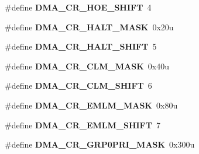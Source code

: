 \begin{DoxyCompactItemize}
\item 
\hypertarget{group___d_m_a___register___masks_gaddcd684abfce8db15928255dc243dbcb}{}\#define {\bfseries D\+M\+A\+\_\+\+C\+R\+\_\+\+H\+O\+E\+\_\+\+S\+H\+I\+F\+T}~4\label{group___d_m_a___register___masks_gaddcd684abfce8db15928255dc243dbcb}

\item 
\hypertarget{group___d_m_a___register___masks_ga03242701b29af462fbfd276ea315dd54}{}\#define {\bfseries D\+M\+A\+\_\+\+C\+R\+\_\+\+H\+A\+L\+T\+\_\+\+M\+A\+S\+K}~0x20u\label{group___d_m_a___register___masks_ga03242701b29af462fbfd276ea315dd54}

\item 
\hypertarget{group___d_m_a___register___masks_ga268b8561e52e0582a789cd08fc36f7aa}{}\#define {\bfseries D\+M\+A\+\_\+\+C\+R\+\_\+\+H\+A\+L\+T\+\_\+\+S\+H\+I\+F\+T}~5\label{group___d_m_a___register___masks_ga268b8561e52e0582a789cd08fc36f7aa}

\item 
\hypertarget{group___d_m_a___register___masks_ga5e8cdd9f77e5dcda3154192addafa22b}{}\#define {\bfseries D\+M\+A\+\_\+\+C\+R\+\_\+\+C\+L\+M\+\_\+\+M\+A\+S\+K}~0x40u\label{group___d_m_a___register___masks_ga5e8cdd9f77e5dcda3154192addafa22b}

\item 
\hypertarget{group___d_m_a___register___masks_gac55b6a95d5882bac595a95e5af39cf1c}{}\#define {\bfseries D\+M\+A\+\_\+\+C\+R\+\_\+\+C\+L\+M\+\_\+\+S\+H\+I\+F\+T}~6\label{group___d_m_a___register___masks_gac55b6a95d5882bac595a95e5af39cf1c}

\item 
\hypertarget{group___d_m_a___register___masks_ga6625e2c683e5f6d20e91d968dab61920}{}\#define {\bfseries D\+M\+A\+\_\+\+C\+R\+\_\+\+E\+M\+L\+M\+\_\+\+M\+A\+S\+K}~0x80u\label{group___d_m_a___register___masks_ga6625e2c683e5f6d20e91d968dab61920}

\item 
\hypertarget{group___d_m_a___register___masks_ga7c925604097c85b391b925d0d8ef6ae0}{}\#define {\bfseries D\+M\+A\+\_\+\+C\+R\+\_\+\+E\+M\+L\+M\+\_\+\+S\+H\+I\+F\+T}~7\label{group___d_m_a___register___masks_ga7c925604097c85b391b925d0d8ef6ae0}

\item 
\hypertarget{group___d_m_a___register___masks_ga7ffff1186872a765f55afe12feed96f1}{}\#define {\bfseries D\+M\+A\+\_\+\+C\+R\+\_\+\+G\+R\+P0\+P\+R\+I\+\_\+\+M\+A\+S\+K}~0x300u\label{group___d_m_a___register___masks_ga7ffff1186872a765f55afe12feed96f1}


\end{DoxyCompactItemize}
